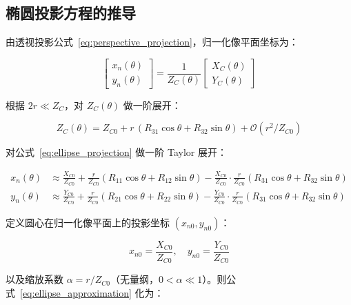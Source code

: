 \documentclass[12pt,a4paper]{article}
\begin{document}
\subsection{椭圆投影方程的推导}

由透视投影公式~\eqref{eq:perspective_projection}，归一化像平面坐标为：

\begin{equation}
\begin{bmatrix}
x_n(\theta) \\[2pt] y_n(\theta)
\end{bmatrix}
=
\frac{1}{Z_C(\theta)}
\begin{bmatrix}
X_C(\theta) \\[2pt] Y_C(\theta)
\end{bmatrix}
\label{eq:ellipse_projection}
\end{equation}

根据 $2r \ll Z_C$，对 $Z_C(\theta)$ 做一阶展开：

\begin{equation}
Z_C(\theta) = Z_{C0} + r \,(R_{31} \cos\theta + R_{32} \sin\theta) + \mathcal{O}(r^2/Z_{C0})
\label{eq:depth_expansion}
\end{equation}

对公式~\eqref{eq:ellipse_projection} 做一阶 Taylor 展开：

\begin{equation}
\begin{aligned}
x_n(\theta) &\approx \frac{X_{C0}}{Z_{C0}} +
\frac{r}{Z_{C0}}(R_{11} \cos\theta + R_{12} \sin\theta)
- \frac{X_{C0}}{Z_{C0}}\cdot\frac{r}{Z_{C0}}(R_{31} \cos\theta + R_{32} \sin\theta) \\[6pt]
y_n(\theta) &\approx \frac{Y_{C0}}{Z_{C0}} +
\frac{r}{Z_{C0}}(R_{21} \cos\theta + R_{22} \sin\theta)
- \frac{Y_{C0}}{Z_{C0}}\cdot\frac{r}{Z_{C0}}(R_{31} \cos\theta + R_{32} \sin\theta)
\end{aligned}
\label{eq:ellipse_approximation}
\end{equation}

定义圆心在归一化像平面上的投影坐标 $(x_{n0}, y_{n0})$：

\begin{equation}
x_{n0} = \frac{X_{C0}}{Z_{C0}}, \quad
y_{n0} = \frac{Y_{C0}}{Z_{C0}}
\label{eq:circle_center_normalized}
\end{equation}

以及缩放系数 $\alpha = r / Z_{C0}$（无量纲，$0 < \alpha \ll 1$）。则公式~\eqref{eq:ellipse_approximation} 化为：
\end{document}
